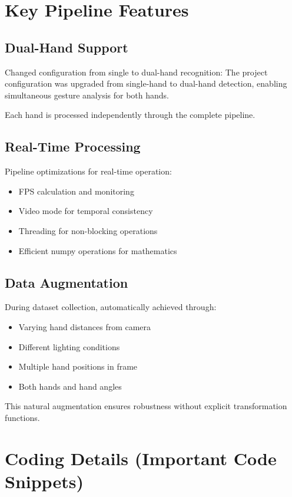\section{Key Pipeline Features}

\subsection{Dual-Hand Support}

Changed configuration from single to dual-hand recognition:
The project configuration was upgraded from single-hand to dual-hand detection, enabling simultaneous gesture analysis for both hands.

Each hand is processed independently through the complete pipeline.

\subsection{Real-Time Processing}

Pipeline optimizations for real-time operation:
\begin{itemize}
    \item FPS calculation and monitoring
    \item Video mode for temporal consistency
    \item Threading for non-blocking operations
    \item Efficient numpy operations for mathematics
\end{itemize}

\subsection{Data Augmentation}

During dataset collection, automatically achieved through:
\begin{itemize}
    \item Varying hand distances from camera
    \item Different lighting conditions
    \item Multiple hand positions in frame
    \item Both hands and hand angles
\end{itemize}

This natural augmentation ensures robustness without explicit transformation functions.

\section{Coding Details (Important Code Snippets)}

